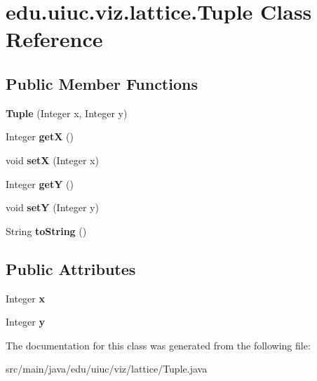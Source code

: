 \hypertarget{classedu_1_1uiuc_1_1viz_1_1lattice_1_1_tuple}{}\section{edu.\+uiuc.\+viz.\+lattice.\+Tuple Class Reference}
\label{classedu_1_1uiuc_1_1viz_1_1lattice_1_1_tuple}
\subsection*{Public Member Functions}
\begin{DoxyCompactItemize}
\item 
\mbox{\label{classedu_1_1uiuc_1_1viz_1_1lattice_1_1_tuple_ad048ef9bfa191e587a80cc7a70d580cf}} 
{\bfseries Tuple} (Integer x, Integer y)
\item 
\mbox{\label{classedu_1_1uiuc_1_1viz_1_1lattice_1_1_tuple_a3091dc769741905c02cdc441b5a54182}} 
Integer {\bfseries getX} ()
\item 
\mbox{\label{classedu_1_1uiuc_1_1viz_1_1lattice_1_1_tuple_a75db848f79d88baae3e16d80d2328023}} 
void {\bfseries setX} (Integer x)
\item 
\mbox{\label{classedu_1_1uiuc_1_1viz_1_1lattice_1_1_tuple_adc65c9c817d53c28807ae5d069a08e0d}} 
Integer {\bfseries getY} ()
\item 
\mbox{\label{classedu_1_1uiuc_1_1viz_1_1lattice_1_1_tuple_a09fc95742902d7a8fd2640a295c33db2}} 
void {\bfseries setY} (Integer y)
\item 
\mbox{\label{classedu_1_1uiuc_1_1viz_1_1lattice_1_1_tuple_afd0da68a9a620730a80410a8dff63e05}} 
String {\bfseries to\+String} ()
\end{DoxyCompactItemize}
\subsection*{Public Attributes}
\begin{DoxyCompactItemize}
\item 
\mbox{\label{classedu_1_1uiuc_1_1viz_1_1lattice_1_1_tuple_a3f6d7f12aff511e2581f7c2bfe25073a}} 
Integer {\bfseries x}
\item 
\mbox{\label{classedu_1_1uiuc_1_1viz_1_1lattice_1_1_tuple_a2954a4526eaaa6126d271e5310dc90d0}} 
Integer {\bfseries y}
\end{DoxyCompactItemize}


The documentation for this class was generated from the following file\+:\begin{DoxyCompactItemize}
\item 
src/main/java/edu/uiuc/viz/lattice/Tuple.\+java\end{DoxyCompactItemize}
